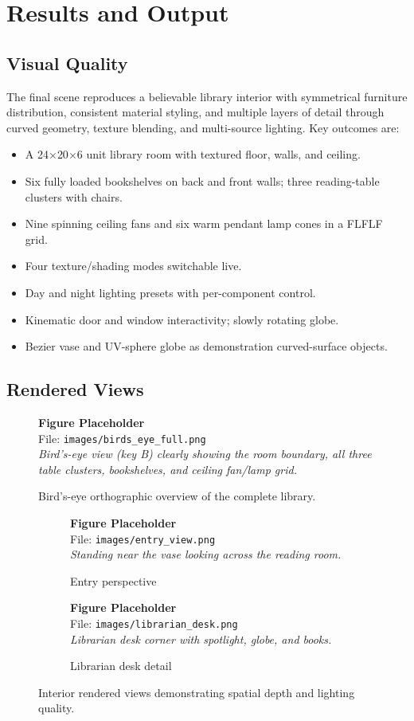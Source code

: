 \documentclass[12pt, a4paper]{article}
\newcommand{\imgph}[2]{%
    \begin{mdframed}[backgroundcolor=lightblue!60, linecolor=sectionblue,
                     linewidth=1pt, roundcorner=4pt, innertopmargin=8pt,
                     innerbottommargin=8pt]
        \centering
        {\bfseries\color{sectionblue} Figure Placeholder}\\[4pt]
        File: \texttt{#1}\\[3pt]
        {\small\itshape #2}
    \end{mdframed}%
}
\begin{document}
\section{Results and Output}

\subsection{Visual Quality}

The final scene reproduces a believable library interior with symmetrical furniture distribution, consistent material styling, and multiple layers of detail through curved geometry, texture blending, and multi-source lighting. Key outcomes are:

\begin{itemize}[leftmargin=1.5em]
    \item A 24$\times$20$\times$6 unit library room with textured floor, walls, and ceiling.
    \item Six fully loaded bookshelves on back and front walls; three reading-table clusters with chairs.
    \item Nine spinning ceiling fans and six warm pendant lamp cones in a FLFLF grid.
    \item Four texture/shading modes switchable live.
    \item Day and night lighting presets with per-component control.
    \item Kinematic door and window interactivity; slowly rotating globe.
    \item Bezier vase and UV-sphere globe as demonstration curved-surface objects.
\end{itemize}

\subsection{Rendered Views}

\begin{figure}[H]
    \centering
    \imgph{images/birds_eye_full.png}{%
        Bird's-eye view (key B) clearly showing the room boundary, all three table clusters,
        bookshelves, and ceiling fan/lamp grid.}
    \caption{Bird's-eye orthographic overview of the complete library.}
    \label{fig:birdseyeresult}
\end{figure}

\begin{figure}[H]
    \centering
    \begin{subfigure}{0.47\textwidth}
        \imgph{images/entry_view.png}{Standing near the vase looking across the reading room.}
        \caption{Entry perspective}
    \end{subfigure}\hfill
    \begin{subfigure}{0.47\textwidth}
        \imgph{images/librarian_desk.png}{Librarian desk corner with spotlight, globe, and books.}
        \caption{Librarian desk detail}
    \end{subfigure}
    \caption{Interior rendered views demonstrating spatial depth and lighting quality.}
    \label{fig:views}
\end{figure}
\end{document}
